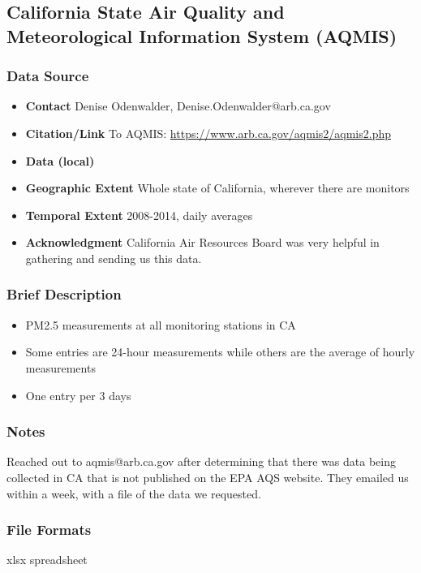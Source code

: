 \subsection{California State Air Quality and Meteorological Information System (AQMIS)}

\subsubsection*{Data Source}

\begin{itemize}[nolistsep]
\item \textbf{Contact} Denise Odenwalder, Denise.Odenwalder@arb.ca.gov
\item \textbf{Citation/Link} To AQMIS: \url{https://www.arb.ca.gov/aqmis2/aqmis2.php}
\item \textbf{Data (local)} 
\item \textbf{Geographic Extent} Whole state of California, wherever there are monitors
\item \textbf{Temporal Extent} 2008-2014, daily averages
\item \textbf{Acknowledgment} California Air Resources Board was very helpful in gathering and sending us this data.
\end{itemize}

\subsubsection*{Brief Description}

\begin{itemize}
\item PM2.5 measurements at all monitoring stations in CA
\item Some entries are 24-hour measurements while others are the average of hourly measurements
\item One entry per 3 days
\end{itemize}

\subsubsection*{Notes}

Reached out to aqmis@arb.ca.gov after determining that there was data being collected in CA that is not published on the EPA AQS website. They emailed us within a week, with a file of the data we requested. 

\subsubsection*{File Formats} 
xlsx spreadsheet

